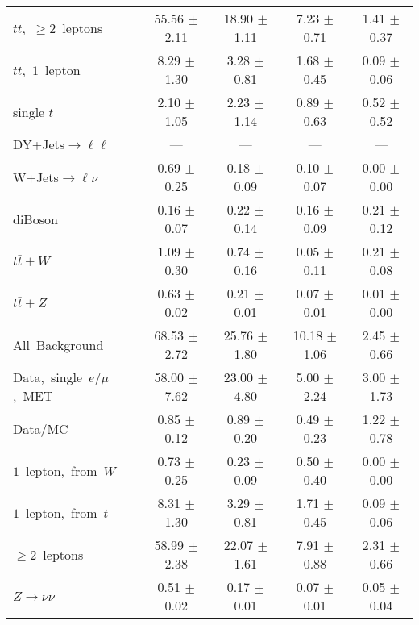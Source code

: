 \documentclass{article}
\begin{document}
\begin{longtable}{|l|c|c|c|c|}
$t\bar{t}$,~$\ge2$~leptons & 55.56 $\pm$ 2.11  & 18.90 $\pm$ 1.11  & 7.23 $\pm$ 0.71  & 1.41 $\pm$ 0.37 \\* 
$t\bar{t}$,~$1$~lepton & 8.29 $\pm$ 1.30  & 3.28 $\pm$ 0.81  & 1.68 $\pm$ 0.45  & 0.09 $\pm$ 0.06 \\* 
single $t$  & 2.10 $\pm$ 1.05  & 2.23 $\pm$ 1.14  & 0.89 $\pm$ 0.63  & 0.52 $\pm$ 0.52 \\* 
DY+Jets$\rightarrow\ell\ell$  & ---  & ---  & ---  & --- \\* 
W+Jets$\rightarrow\ell\nu$  & 0.69 $\pm$ 0.25  & 0.18 $\pm$ 0.09  & 0.10 $\pm$ 0.07  & 0.00 $\pm$ 0.00 \\* 
diBoson  & 0.16 $\pm$ 0.07  & 0.22 $\pm$ 0.14  & 0.16 $\pm$ 0.09  & 0.21 $\pm$ 0.12 \\* 
$t\bar{t}+W$  & 1.09 $\pm$ 0.30  & 0.74 $\pm$ 0.16  & 0.05 $\pm$ 0.11  & 0.21 $\pm$ 0.08 \\* 
$t\bar{t}+Z$  & 0.63 $\pm$ 0.02  & 0.21 $\pm$ 0.01  & 0.07 $\pm$ 0.01  & 0.01 $\pm$ 0.00 \\* 
\hline \hline 
All~Background  & 68.53 $\pm$ 2.72  & 25.76 $\pm$ 1.80  & 10.18 $\pm$ 1.06  & 2.45 $\pm$ 0.66 \\* 
Data,~single~$e/\mu$,~MET  & 58.00 $\pm$ 7.62  & 23.00 $\pm$ 4.80  & 5.00 $\pm$ 2.24  & 3.00 $\pm$ 1.73 \\* 
Data/MC  & 0.85 $\pm$ 0.12  & 0.89 $\pm$ 0.20  & 0.49 $\pm$ 0.23  & 1.22 $\pm$ 0.78 \\* 
\hline \hline 
$1$~lepton,~from~$W$  & 0.73 $\pm$ 0.25  & 0.23 $\pm$ 0.09  & 0.50 $\pm$ 0.40  & 0.00 $\pm$ 0.00 \\* 
$1$~lepton,~from~$t$  & 8.31 $\pm$ 1.30  & 3.29 $\pm$ 0.81  & 1.71 $\pm$ 0.45  & 0.09 $\pm$ 0.06 \\* 
$\ge2$~leptons  & 58.99 $\pm$ 2.38  & 22.07 $\pm$ 1.61  & 7.91 $\pm$ 0.88  & 2.31 $\pm$ 0.66 \\* 
$Z\rightarrow\nu\nu$  & 0.51 $\pm$ 0.02  & 0.17 $\pm$ 0.01  & 0.07 $\pm$ 0.01  & 0.05 $\pm$ 0.04 \\* 
\hline 
\end{longtable} 

 
 
 
 
\pagebreak 

 
 
 
 
\end{document}
